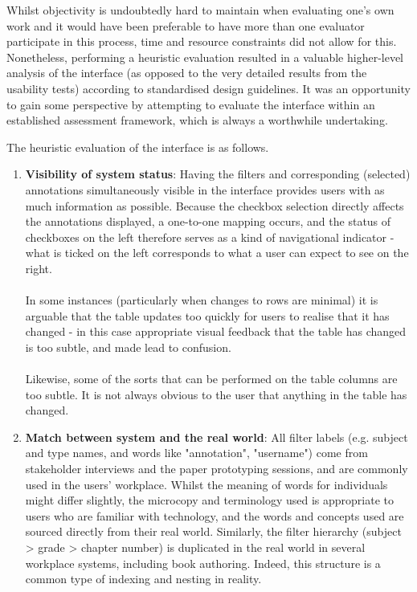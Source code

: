 Whilst objectivity is undoubtedly hard to maintain when evaluating one's own work and it would have been preferable to have more than one evaluator participate in this process, time and resource constraints did not allow for this. Nonetheless, performing a heuristic evaluation resulted in a valuable higher-level analysis of the interface (as opposed to the very detailed results from the usability tests) according to standardised design guidelines.  It was an opportunity to gain some perspective by attempting to evaluate the interface within an established assessment framework, which is always a worthwhile undertaking.


The heuristic evaluation of the interface is as follows.
\begin{enumerate}
 \item \textbf{Visibility of system status}: Having the filters and corresponding (selected) annotations simultaneously visible in the interface provides users with as much information as possible. Because the checkbox selection directly affects the annotations displayed, a one-to-one mapping occurs, and the status of checkboxes on the left therefore serves as a kind of navigational indicator - what is ticked on the left corresponds to what a user can expect to see on the right. \\
 \\
 In some instances (particularly when changes to rows are minimal) it is arguable that the table updates too quickly for users to realise that it has changed - in this case appropriate visual feedback that the table has changed is too subtle, and made lead to confusion. \\ 
 \\
 Likewise, some of the sorts that can be performed on the table columns are too subtle. It is not always obvious to the user that anything in the table has changed.

\item \textbf{Match between system and the real world}: All filter labels (e.g. subject and type names, and words like "annotation", "username") come from stakeholder interviews and the paper prototyping sessions, and are commonly used in the users' workplace. Whilst the meaning of words for individuals might differ slightly, the microcopy and terminology used is appropriate to users who are familiar with technology, and the words and concepts used are sourced directly from their real world. Similarly, the filter hierarchy (subject > grade > chapter number) is duplicated in the real world in several workplace systems, including book authoring. Indeed, this structure is a common type of indexing and nesting in reality. 


\end{enumerate}
